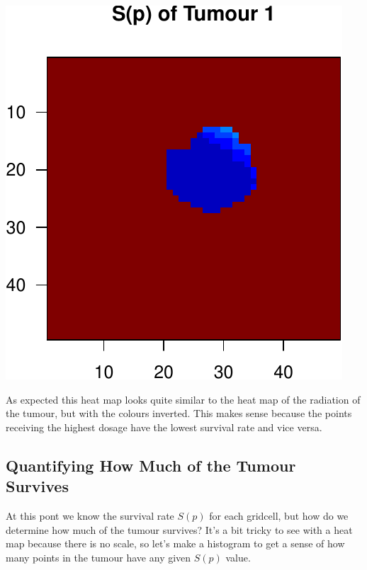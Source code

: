 \documentclass[]{article}
\begin{document}
\begin{center}\includegraphics{TumourSurvival_files/figure-latex/unnamed-chunk-8-1} \end{center}

As expected this heat map looks quite similar to the heat map of the
radiation of the tumour, but with the colours inverted. This makes sense
because the points receiving the highest dosage have the lowest survival
rate and vice versa.

\subsection{Quantifying How Much of the Tumour
Survives}\label{quantifying-how-much-of-the-tumour-survives}

At this pont we know the survival rate \(S(p)\) for each gridcell, but
how do we determine how much of the tumour survives? It's a bit tricky
to see with a heat map because there is no scale, so let's make a
histogram to get a sense of how many points in the tumour have any given
\(S(p)\) value.
\end{document}
